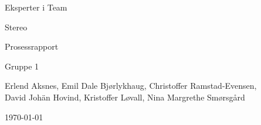 \begin{titlepage}
\begin{center}
\vspace*{1in}
{\LARGE Eksperter i Team}
\par
\vspace{1cm}


\begin{figure}[ht!]
\centering
\label{overflow}
\end{figure}


{\LARGE Stereo}
\par
\vspace{0.6in}
{\LARGE Prosessrapport}
\par
\vspace{0.2in}
{\Large Gruppe 1}
\par
\vfill
\par
\vspace{0.5in}
Erlend Aksnes, Emil Dale Bjørlykhaug, Christoffer Ramstad-Evensen, \\David Johän Hovind, Kristoffer Løvall, Nina Margrethe Smørsgård
\par
\vspace{0.4cm}
\today
\end{center}
\end{titlepage}
